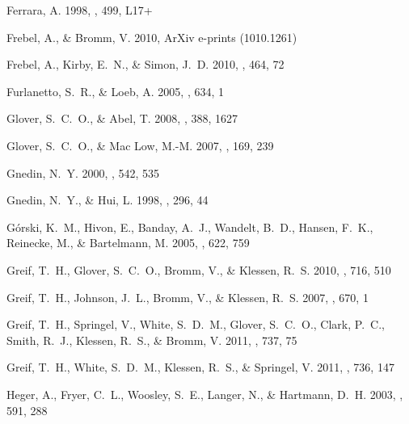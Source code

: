 \documentclass[apj]{emulateapj}
\begin{document}
\begin{thebibliography}{108}
{Ferrara}, A. 1998, \apjl, 499, L17+

{Frebel}, A., \& {Bromm}, V. 2010, ArXiv e-prints (1010.1261)

{Frebel}, A., {Kirby}, E.~N., \& {Simon}, J.~D. 2010, \nat, 464, 72

{Furlanetto}, S.~R., \& {Loeb}, A. 2005, \apj, 634, 1

{Glover}, S.~C.~O., \& {Abel}, T. 2008, \mnras, 388, 1627

{Glover}, S.~C.~O., \& {Mac Low}, M.-M. 2007, \apjs, 169, 239

{Gnedin}, N.~Y. 2000, \apj, 542, 535

{Gnedin}, N.~Y., \& {Hui}, L. 1998, \mnras, 296, 44

{G{\'o}rski}, K.~M., {Hivon}, E., {Banday}, A.~J., {Wandelt}, B.~D., {Hansen},
  F.~K., {Reinecke}, M., \& {Bartelmann}, M. 2005, \apj, 622, 759

{Greif}, T.~H., {Glover}, S.~C.~O., {Bromm}, V., \& {Klessen}, R.~S. 2010,
  \apj, 716, 510

{Greif}, T.~H., {Johnson}, J.~L., {Bromm}, V., \& {Klessen}, R.~S. 2007, \apj,
  670, 1

{Greif}, T.~H., {Springel}, V., {White}, S.~D.~M., {Glover}, S.~C.~O., {Clark},
  P.~C., {Smith}, R.~J., {Klessen}, R.~S., \& {Bromm}, V. 2011{},
  \apj, 737, 75

{Greif}, T.~H., {White}, S.~D.~M., {Klessen}, R.~S., \& {Springel}, V.
  2011{}, \apj, 736, 147

{Heger}, A., {Fryer}, C.~L., {Woosley}, S.~E., {Langer}, N., \& {Hartmann},
  D.~H. 2003, \apj, 591, 288


\end{thebibliography}
\end{document}
